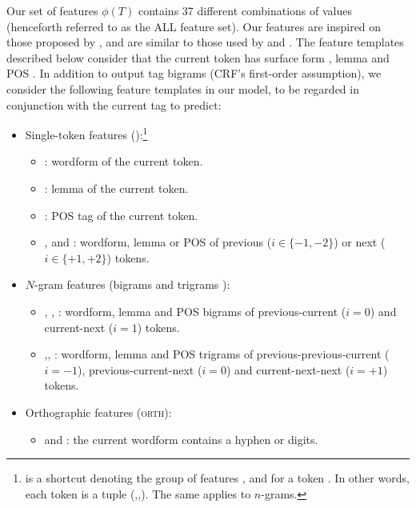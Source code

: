 \documentclass[output=paper,
modfonts
]{langscibook}
\begin{document}
Our set of features $\phi(T)$ contains 37 different combinations of values  (henceforth referred to as the {\textsc ALL} feature set). Our features are inspired on those proposed by \citet{constant-sigogne:2011:MWE}, and are similar to those used by \citet{Schneider14b} and \citet{riedl-biemann:2016:MWE}. The feature templates described below consider that the current token  has surface form , lemma  and POS . In addition to output tag bigrams (CRF's first-order assumption), we consider the following feature templates in our model, to be regarded in conjunction with the current tag to predict:
\begin{itemize}
\item Single-token features ():\footnote{ is a shortcut denoting the group of features ,  and  for a token . In other words, each token  is a tuple (,,). The same applies to $n$-grams.}
\begin{itemize}
\item {} : wordform of the current token.
\item {} : lemma of the current token.
\item {} : POS tag of the current token.
\item {},  and : wordform, lemma or POS of previous ($i \in \{-1, -2\}$) or next ($i \in \{+1, +2\}$) tokens.
\end{itemize}
\item $N$-gram features (bigrams  and trigrams ):
\begin{itemize}
\item {}, , : wordform, lemma and POS bigrams of previous-current ($i=0$) and current-next ($i=1$) tokens.
\item {},, : wordform, lemma and POS trigrams of previous-previous-current ($i=-1$), previous-current-next ($i=0$) and current-next-next ($i=+1$) tokens.
\end{itemize}
\item Orthographic features (\textsc{orth}):
\begin{itemize}
\item {} and : the current wordform  contains a hyphen or digits.

\end{itemize}
\end{itemize}
\end{document}
